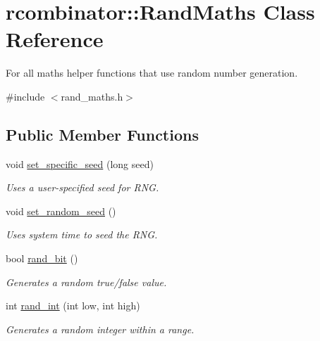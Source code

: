 \hypertarget{classrcombinator_1_1RandMaths}{}\section{rcombinator\+:\+:Rand\+Maths Class Reference}
\label{classrcombinator_1_1RandMaths}


For all maths helper functions that use random number generation.  




{\ttfamily \#include $<$rand\+\_\+maths.\+h$>$}

\subsection*{Public Member Functions}
\begin{DoxyCompactItemize}
\item 
void \mbox{\hyperlink{classrcombinator_1_1RandMaths_a76c7dc43d0faee17d4b328bd342934e0}{set\+\_\+specific\+\_\+seed}} (long seed)
\begin{DoxyCompactList}\small\item\em Uses a user-\/specified seed for R\+NG. \end{DoxyCompactList}\item 
void \mbox{\hyperlink{classrcombinator_1_1RandMaths_a2b61e31de6067ffa35531d5bde40f4c6}{set\+\_\+random\+\_\+seed}} ()
\begin{DoxyCompactList}\small\item\em Uses system time to seed the R\+NG. \end{DoxyCompactList}\item 
\mbox{\label{classrcombinator_1_1RandMaths_a4f82863502ca04438a331fd309ca8b5e}} 
bool \mbox{\hyperlink{classrcombinator_1_1RandMaths_a4f82863502ca04438a331fd309ca8b5e}{rand\+\_\+bit}} ()
\begin{DoxyCompactList}\small\item\em Generates a random true/false value. \end{DoxyCompactList}\item 
int \mbox{\hyperlink{classrcombinator_1_1RandMaths_ae417da209eb8a9d1b2217e7a5397926c}{rand\+\_\+int}} (int low, int high)
\begin{DoxyCompactList}\small\item\em Generates a random integer within a range. \end{DoxyCompactList}\item 

\end{DoxyCompactItemize}
